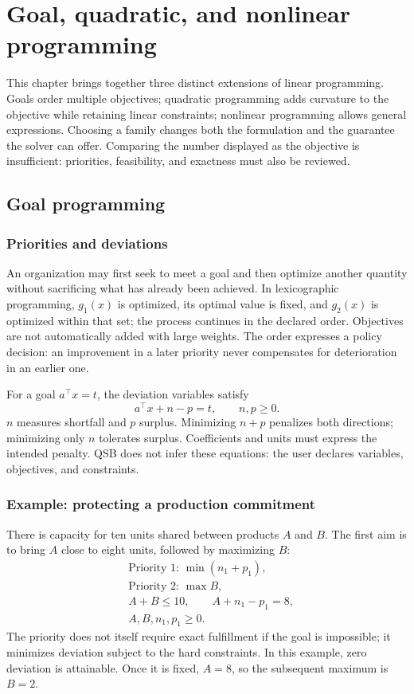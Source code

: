 \chapter{Goal, quadratic, and nonlinear programming}
\label{chap:optimizacion-avanzada}

This chapter brings together three distinct extensions of linear programming.
Goals order multiple objectives; quadratic programming adds curvature to the
objective while retaining linear constraints; nonlinear programming allows
general expressions. Choosing a family changes both the formulation and the
guarantee the solver can offer. Comparing the number displayed as the objective
is insufficient: priorities, feasibility, and exactness must also be reviewed.

\section{Goal programming}
\subsection{Priorities and deviations}
An organization may first seek to meet a goal and then optimize another
quantity without sacrificing what has already been achieved. In lexicographic
programming, \(g_1(x)\) is optimized, its optimal value is fixed, and
\(g_2(x)\) is optimized within that set; the process continues in the declared
order. Objectives are not automatically added with large weights. The order
expresses a policy decision: an improvement in a later priority never
compensates for deterioration in an earlier one.

For a goal \(a^\top x=t\), the deviation variables satisfy
\[
 a^\top x+n-p=t,\qquad n,p\geq0.
\]
\(n\) measures shortfall and \(p\) surplus. Minimizing \(n+p\) penalizes both
directions; minimizing only \(n\) tolerates surplus. Coefficients and units
must express the intended penalty. QSB does not infer these equations:
the user declares variables, objectives, and constraints.

\subsection{Example: protecting a production commitment}
There is capacity for ten units shared between products \(A\) and \(B\).
The first aim is to bring \(A\) close to eight units, followed by maximizing \(B\):
\[
\begin{aligned}
 &\text{Priority 1: }\min(n_1+p_1),\\
 &\text{Priority 2: }\max B,\\
 &A+B\leq10,\qquad A+n_1-p_1=8,\\
 &A,B,n_1,p_1\geq0.
\end{aligned}
\]
The priority does not itself require exact fulfillment if the goal is
impossible; it minimizes deviation subject to the hard constraints.
In this example, zero deviation is attainable. Once it is fixed,
\(A=8\), so the subsequent maximum is \(B=2\).

